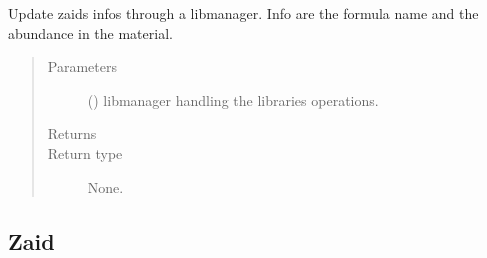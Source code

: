 \documentclass[letterpaper,10pt,english]{sphinxmanual}
\begin{document}
\begin{fulllineitems}
\begin{fulllineitems}
\label{\detokenize{api/inputgeneration:matreader.Element.update_zaidinfo}}
\sphinxAtStartPar
Update zaids infos through a libmanager. Info are the formula name and
the abundance in the material.
\begin{quote}\begin{description}
\item[{Parameters}] \leavevmode
\sphinxAtStartPar
{} ({\hyperref[\detokenize{api/initobjects:libmanager.LibManager}]{}}) \textendash{} libmanager handling the libraries operations.

\item[{Returns}] \leavevmode
\sphinxAtStartPar


\item[{Return type}] \leavevmode
\sphinxAtStartPar
None.

\end{description}\end{quote}

\end{fulllineitems}


\end{fulllineitems}



\subsection{Zaid}
\label{\detokenize{api/inputgeneration:zaid}}
\end{document}
